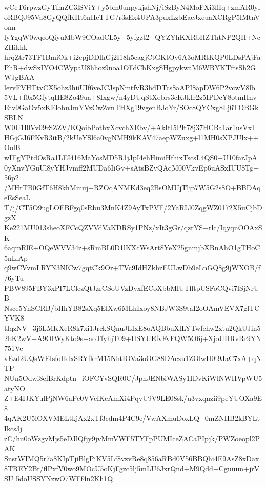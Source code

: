 wCeT6rpwzGyTfmZC3lSViY+y5bm0unpykjshNj/iSzByN4MoFXi3flIq+zmAR0yl
oRBQJ95Va8GyQQfKHt6nHeTTG/r3sEx4UPA3puxLzbEaeJxeuaXCRgP5lMtnVonn
lyYgqW0wqeoQiyuMbW9COadCL5y+5yfgzt2+QYZYhKXRbHZThtNP2QH+NcZHikhk
hrqZtr73TF1BmiOk+i2epjDDlhGj2I18h5eagjCtGKtOy6A3oMRtKQP0LDsPAjFa
PhR+dwSxIYO4CWypaU8hhoz9noa1OFdChKxgSHgpykwaM6WBYKTftsSh2GWJgBAA
lervFVHTtvCX5ohz3hiiUIf6veJCJspNmtfvR3hdDTcs8aAPI8apDW6P2vcwV8lb
5VL+f0x5GfytqHE8Zo49ua+8Ixgw/n4yDUqStXqbrs3cKJkIr2z5IPDcY8otmHnv
Etv9GaOv5xKElobuJmYVzCwZvnTHXg19vgenBJoYr/SOc8QYCxg8Lj6TOBGkSBLN
W0U1I0Vv09rSZZV/KQoibPothxXcvchXEbv/+AkItI5Plt78j37HCBa1ar1usVxI
HGjGJ6FKvR3itB/2kUeYSl6a0vgNMH9kKAV47aepWZuxg+l1MH0sXPJUlx++OolB
wIEgYPtdOsRa1LEI416MaYosMD5R1jJpI4ehHimiHfhixTscsL4QS0+U10farJpA
0yXnvYGuUl8yYHJvmff2MUDa6IiGv+sAtsBZvQAqM00VkvEp6uASxIUU8Tg+56p2
/MHrTB0GfT6H8khMmuj+RZOqANMKd3eq2BsOMUjTljp7W5G2s8O+BBDAqeEsSeaL
T/j/CT5O9ugLOEBFgq0sRbu3MnK4Z9AyTxPVF/2YaRLl0ZqgWZ0172X5uCjbDgzX
Ke221MU013sheoXFCcQZVVdVaKDRSy1PNz/xIt3gGr/qzrYS+rlc/IqyqnOOAxSK
6aqmRlE+OQeWVV34z+sRmBL0D1lKXcWsArt8YeX25gnmjbXBnAhO1gTHoC5nLlAp
q9wCVvmLRYN3NICw7gqtCk9Or+TVc9IdHZkhzEULwDb9eLnGQ8g9jWXOB/f/6yTu
PBW895FBY3xPI7LClezQtJzrCSoUVzDyxfECoXbbMlUTfltpUSFoCQvi7lSjNrUB
Nsce5YnSCRB/bHhYB82sXq5ElXw6MLhIxoy8NBJW3S9taI2oOAmVEVX7glTCYVK8
tIqzNV+3j6LMKXeR8k7xi1JrckSQnuJLIxE8oAQBbuXlLYTwfehw2xtu2QkUJin5
2bK2wV+A9OIWyKto9s+aoTfyhjT09+HSYUEfvFvFQW5O6j+XjoUHRvRr9YN751Ve
vEzd2UQsWEIsfoHdxSRYfkrM15NhtIOVa3oOG88DAezu1ZOlwH0t9JaC7xA+qNTP
NUn5Odwi8efBrKdptn+iOFCYvSQR0C/JphJENbiWASy1IDvKiWlNWHVpWU5atyNO
Z+E4IJKYulPjNW6aPe0VVclKcAmXi4PqvU9V9LE08sk/u3vxqnzii9peYUOXa9E8
4qAK2U5lOXVMELtkjAx2xTf3cdm4P4C9e/VwAXmuDoxLQ+0mZNHB2kBYLtIkcs3j
zC/hu0oWzgvMjs5eDJlQfjy9jvMmVWF5TYFpPUMIceZACaPIpjk/PWZoeopl2PAK
SnsrWIMQ5r7a8KIpTjiBlgPiKV5Lf8vzvRe8q856aRBd0V56BBQhi4E9AsZ8xDax
8TREY2Br/flPxfV0wo9MOcU5oKjFgzc5lj5mLU6JxrQnd+M9Qdd+Cguuun+jrVSU
5doUSSYNzwO7WFf4n2Kh1Q==

